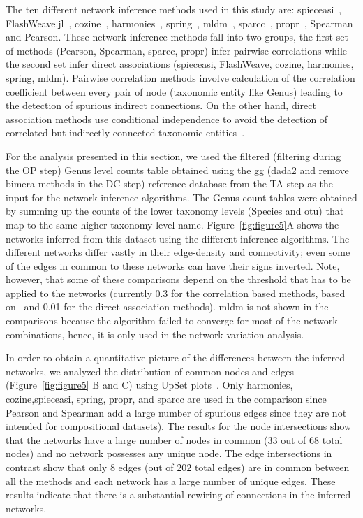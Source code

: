   The ten different network inference methods used in this study are: \ac{spieceasi}~\cite{Kurtz2015}, FlashWeave.jl~\cite{tackmannRapidInferenceDirect2019}, \ac{cozine}~\cite{haCompositionalZeroinflatedNetwork2020a}, \ac{harmonies}~\cite{jiangHARMONIESHybridApproach2020}, \ac{spring}~\cite{yoonMicrobialNetworksSPRING2019}, \ac{mldm}~\cite{Yang2017}, \ac{sparcc}~\cite{Friedman2012,Watts2018}, propr~\cite{quinnProprRpackageIdentifying2017}, Spearman and Pearson.
  These network inference methods fall into two groups, the first set of methods (Pearson, Spearman, \ac{sparcc}, propr) infer pairwise correlations while the second set infer direct associations (\ac{spieceasi}, FlashWeave, \ac{cozine}, \ac{harmonies}, \ac{spring}, \ac{mldm}).
  Pairwise correlation methods involve calculation of the correlation coefficient between every pair of node (taxonomic entity like Genus) leading to the detection of spurious indirect connections.
  On the other hand, direct association methods use conditional independence to avoid the detection of correlated but indirectly connected taxonomic entities~\cite{Kurtz2015,Menon2018}.

  For the analysis presented in this section, we used the filtered (filtering during the OP step) Genus level counts table obtained using the \ac{gg} (dada2 and remove bimera methods in the DC step) reference database from the TA step as the input for the network inference algorithms.
  The Genus count tables were obtained by summing up the counts of the lower taxonomy levels (Species and \ac{otu}) that map to the same higher taxonomy level name.
  Figure~\ref{fig:figure5}A shows the networks inferred from this dataset using the different inference algorithms.
  The different networks differ vastly in their edge-density and connectivity; even some of the edges in common to these networks can have their signs inverted.
  Note, however, that some of these comparisons depend on the threshold that has to be applied to the networks (currently 0.3 for the correlation based methods, based on~\cite{Friedman2012} and 0.01 for the direct association methods).
  \ac{mldm} is not shown in the comparisons because the algorithm failed to converge for most of the network combinations, hence, it is only used in the network variation analysis.

  In order to obtain a quantitative picture of the differences between the inferred networks, we analyzed the distribution of common nodes and edges (Figure~\ref{fig:figure5} B and C) using UpSet plots~\cite{Lex}.
  Only \ac{harmonies}, \ac{cozine},\ac{spieceasi}, \ac{spring}, propr, and \ac{sparcc} are used in the comparison since Pearson and Spearman add a large number of spurious edges since they are not intended for compositional datasets).
  The results for the node intersections show that the networks have a large number of nodes in common ($33$ out of $68$ total nodes) and no network possesses any unique node.
  The edge intersections in contrast show that only $8$ edges (out of $202$ total edges) are in common between all the methods and each network has a large number of unique edges.
  These results indicate that there is a substantial rewiring of connections in the inferred networks.

